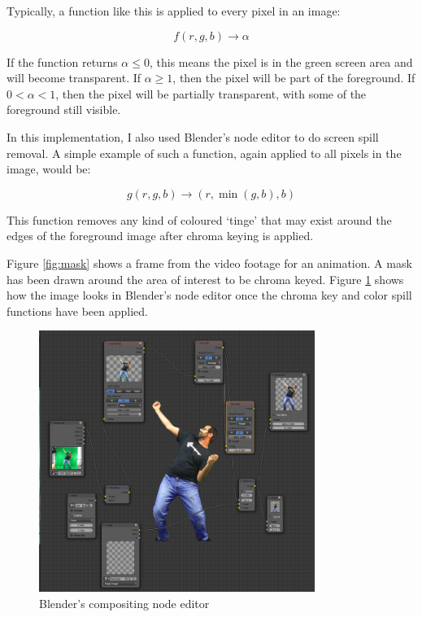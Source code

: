 \documentclass[11pt]{article}
\begin{document}
Typically, a function like this is applied to every pixel in an image:

$$f(r, g, b) \rightarrow \alpha$$

If the function returns $\alpha \leq 0$, this means the pixel is in the green screen area and will become transparent. If $\alpha \geq 1$, then the pixel will be part of the foreground. If $0 < \alpha < 1$, then the pixel will be partially transparent, with some of the foreground still visible.

In this implementation, I also used Blender's node editor to do screen spill removal. A simple example of such a function, again applied to all pixels in the image, would be:

$$g(r, g, b) \rightarrow (r, \min(g, b), b)$$

This function removes any kind of coloured `tinge' that may exist around the edges of the foreground image after chroma keying is applied.

Figure \ref{fig:mask} shows a frame from the video footage for an animation. A mask has been drawn around the area of interest to be chroma keyed. Figure \ref{fig:compositing} shows how the image looks in Blender's node editor once the chroma key and color spill functions have been applied.

\begin{figure}[tp]
\centering
\includegraphics[width=0.8\textwidth]{blender.png}
\caption{Blender's compositing node editor}
\label{fig:compositing}
\end{figure}
\end{document}
